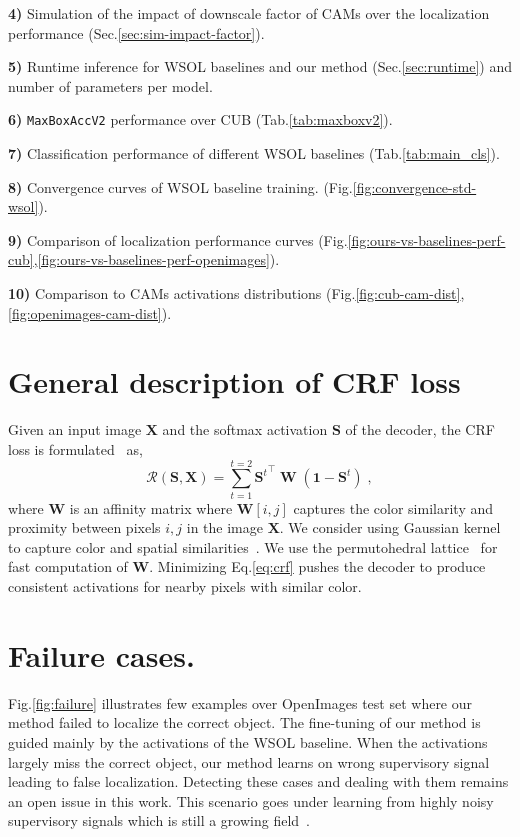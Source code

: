 \documentclass[twocolumn]{article}
\newcommand\newmaxboxacc{\texttt{MaxBoxAccV2}\xspace}
\theoremstyle{definition}
\begin{document}
\noindent \textbf{4)} Simulation of the impact of downscale factor of CAMs over the localization performance (Sec.\ref{sec:sim-impact-factor}).

\noindent \textbf{5)} Runtime inference for WSOL baselines and our method (Sec.\ref{sec:runtime}) and number of parameters per model.

\noindent \textbf{6)} \newmaxboxacc performance over CUB (Tab.\ref{tab:maxboxv2}).

\noindent  \textbf{7)} Classification performance of different WSOL baselines (Tab.\ref{tab:main_cls}).

\noindent  \textbf{8)} Convergence curves of WSOL baseline training. (Fig.\ref{fig:convergence-std-wsol}).

\noindent  \textbf{9)} Comparison of localization performance curves (Fig.\ref{fig:ours-vs-baselines-perf-cub},\ref{fig:ours-vs-baselines-perf-openimages}).

\noindent  \textbf{10)} Comparison to CAMs activations distributions (Fig.\ref{fig:cub-cam-dist}, \ref{fig:openimages-cam-dist}).


\section{General description of CRF loss}
\label{sec:crf}
Given an input image $\bm{X}$ and the softmax activation ${\bm{S}}$ of the decoder, the CRF loss is formulated~\cite{tang2018regularized}  as,
\begin{equation}
    \label{eq:crf}
    \mathcal{R}(\bm{S}, \bm{X}) = \sum_{t=1}^{t=2} {\bm{S}^t}^{\top} \; \bm{W} \; (\bm{1} - \bm{S}^t) \;,
\end{equation}
where ${\bm{W}}$ is an affinity matrix where ${\bm{W}[i, j]}$ captures the color similarity and proximity between pixels ${i, j}$ in the image ${\bm{X}}$. We consider using Gaussian kernel to capture color and spatial similarities~\cite{KrahenbuhlK11crf}. We use the permutohedral lattice~\cite{AdamsBD10lattice} for fast computation of ${\bm{W}}$. Minimizing Eq.\ref{eq:crf} pushes the decoder to produce consistent activations for nearby pixels with similar color.


\section{Failure cases.}
\label{sec:fail}

Fig.\ref{fig:failure} illustrates few examples over OpenImages test set where our method failed to localize the correct object. The fine-tuning of our method is guided mainly by the activations of the WSOL baseline. When the activations largely miss the correct object, our method learns on wrong supervisory signal leading to false localization. Detecting these cases and dealing with them remains an open issue in this work. This scenario goes under learning from highly noisy supervisory signals which is still a growing field~\cite{songsurvey2020}.
\end{document}
